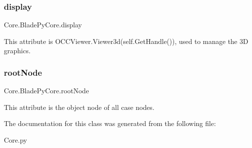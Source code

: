 \subsubsection{\texorpdfstring{display}{display}}
{\footnotesize\ttfamily Core.\+Blade\+Py\+Core.\+display}



This attribute is O\+C\+C\+Viewer.\+Viewer3d(self.\+Get\+Handle()), used to manage the 3D graphics. 

\hypertarget{a00081_a3cbd742c4a4a706d44d5265e19b25aaa}{}\label{a00081_a3cbd742c4a4a706d44d5265e19b25aaa} 
\subsubsection{\texorpdfstring{root\+Node}{rootNode}}
{\footnotesize\ttfamily Core.\+Blade\+Py\+Core.\+root\+Node}



This attribute is the object node of all case nodes. 



The documentation for this class was generated from the following file\+:\begin{DoxyCompactItemize}
\item 
Core.\+py\end{DoxyCompactItemize}
